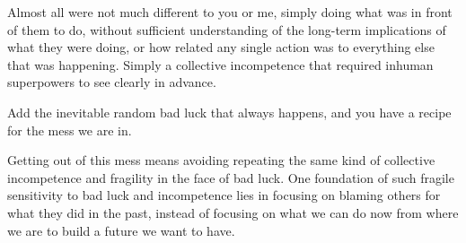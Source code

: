 Almost all were not much different to you or me, simply doing what was in front of them to do, without sufficient understanding of the long-term implications of what they were doing, or how related any single action was to everything else that was happening. Simply a collective incompetence that required inhuman superpowers to see clearly in advance.


Add the inevitable random bad luck that always happens, and you have a recipe for the mess we are in.


Getting out of this mess means avoiding repeating the same kind of collective incompetence and fragility in the face of bad luck. One foundation of such fragile sensitivity to bad luck and incompetence lies in focusing on blaming others for what they did in the past, instead of focusing on what we can do now from where we are to build a future we want to have.